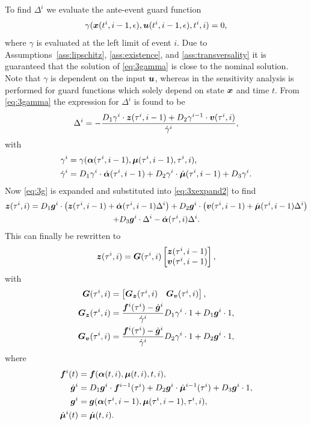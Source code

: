 \documentclass[../DC2017114Bouma.tex]{subfiles}
\begin{document}
To find $\Delta^{i}$ we evaluate the ante-event guard function
\begin{align}
\gamma({\boldsymbol{x}}(t^{i},i-1,\epsilon),{\boldsymbol{u}}(t^{i},i-1,\epsilon),t^{i},i) = 0,\label{eq:3gamma}
\end{align}
where $\gamma$ is evaluated at the left limit of event $i$. Due to Assumptions~\ref{ass:lipschitz}, \ref{ass:existence}, and \ref{ass:transversality} it is guaranteed that the solution of \eqref{eq:3gamma} is close to the nominal solution. Note that $\gamma$ is dependent on the input ${\boldsymbol{u}}$, whereas in \cite{Chen2018a} the sensitivity analysis is performed for guard functions which solely depend on state ${\boldsymbol{x}}$ and time $t$. From \eqref{eq:3gamma} the expression for $\Delta^{i}$ is found to be
\begin{align}
\Delta^{i} = -\frac{D_1\gamma^{i}\cdot{\boldsymbol{z}}(\tau^i,i-1) + D_2\gamma^{i-1}\cdot{\boldsymbol{v}}(\tau^i,i)}{\dot{\gamma}^{i}},\label{eq}
\end{align}
with
\begin{align}
\gamma^i &= \gamma(\boldsymbol{\alpha}(\tau^i,i-1),\boldsymbol{\mu}(\tau^i,i-1),\tau^i,i),\\
\dot{\gamma}^i &= D_1\gamma^i\cdot\dot{\boldsymbol{\alpha}}(\tau^i,i-1) + D_2\gamma^i\cdot\dot{\boldsymbol{\mu}}(\tau^i,i-1) + D_3\gamma^i.
\end{align}
Now \eqref{eq:3g} is expanded and substituted  into \eqref{eq:3xexpand2} to find
\begin{multline}
{\boldsymbol{z}}(\tau^i,i) = D_1{\boldsymbol{g}}^i\cdot\left({\boldsymbol{z}}(\tau^i,i-1) + \dot{\boldsymbol{\alpha}}(\tau^i,i-1)\Delta^i\right) + D_2{\boldsymbol{g}}^i\cdot\left({\boldsymbol{v}}(\tau^i,i-1) + \dot{\boldsymbol{\mu}}(\tau^i,i-1)\Delta^i\right)\\ + D_3{\boldsymbol{g}}^i\cdot\Delta^i - \dot{\boldsymbol{\alpha}}(\tau^i,i)\Delta^i.
\end{multline}
This can finally be rewritten to
\begin{align}
{\boldsymbol{z}}(\tau^i,i) = {\boldsymbol{G}}(\tau^i,i)\begin{bmatrix}
{\boldsymbol{z}}(\tau^i,i-1) \\ {\boldsymbol{v}}(\tau^i,i-1)
\end{bmatrix},
\end{align}
with 
\begin{align}
{\boldsymbol{G}}(\tau^i,i) &= \begin{bmatrix}
{\boldsymbol{G}}_{{\boldsymbol{z}}}(\tau^i,i) & {\boldsymbol{G}}_{{\boldsymbol{v}}}(\tau^i,i)
\end{bmatrix},\\
{\boldsymbol{G}}_{{\boldsymbol{z}}}(\tau^i,i) & = \frac{{\boldsymbol{f}}^i(\tau^i) - \dot{{\boldsymbol{g}}}^i}{\dot{\gamma}^i}D_1\gamma^i\cdot 1 + D_1{\boldsymbol{g}}^i\cdot 1,\\
{\boldsymbol{G}}_{{\boldsymbol{v}}}(\tau^i,i) & = \frac{{\boldsymbol{f}}^i(\tau^i) - \dot{{\boldsymbol{g}}}^i}{\dot{\gamma}^i}D_2\gamma^i\cdot 1 + D_2{\boldsymbol{g}}^i\cdot 1,
\end{align}
where
\begin{align}
{\boldsymbol{f}}^i(t) &= {\boldsymbol{f}}(\boldsymbol{\alpha}(t,i),\boldsymbol{\mu}(t,i),t,i),\\
\dot{{\boldsymbol{g}}}^i &= D_1{\boldsymbol{g}}^i\cdot {\boldsymbol{f}}^{i-1}(\tau^i) + D_2{\boldsymbol{g}}^i\cdot \dot{\boldsymbol{\mu}}^{i-1}(\tau^i) + D_3{\boldsymbol{g}}^i\cdot 1,\\
{\boldsymbol{g}}^i &= {\boldsymbol{g}}(\boldsymbol{\alpha}(\tau^i,i-1),\boldsymbol{\mu}(\tau^i,i-1),\tau^i,i),\\
\dot{\boldsymbol{\mu}}^{i}(t) &= \dot{\boldsymbol{\mu}}(t,i).
\end{align}
\end{document}
